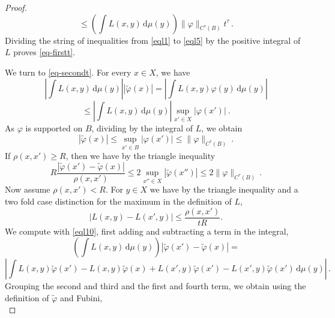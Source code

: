 \begin{proof}
    \begin{equation}\label{eql5}
         \le \left(\int L(x,y) \, \mathrm{d}\mu(y)\right)
         \|\varphi\|_{C^\tau(B)} t^{\tau} \, .
    \end{equation}
 Dividing the string of inequalities from \eqref{eql1} to
\eqref{eql5} by the positive integral of $L$ proves \eqref{eq-firstt}.


We turn to \eqref{eq-secondt}. For every $x\in X$, we have
\begin{equation}
    \left|\int L(x,y) \, \mathrm{d}\mu(y)\right||\tilde{\varphi}(x)|
    =\left|\int L(x,y) {\varphi}(y)\, \mathrm{d}\mu(y)\right|
\end{equation}
 \begin{equation}
    \le \left|\int L(x,y) \, \mathrm{d}\mu(y)\right| \sup_{x'\in X}
    |{\varphi}(x')|\ .
\end{equation}
As $\varphi$ is supported on $B$, dividing by the integral of $L$, we obtain
\begin{equation}\label{eql42}
 |\tilde{\varphi}(x)|\le \sup_{x'\in B}
    |{\varphi}(x')|\le \|\varphi\|_{C^\tau(B)}\ .
\end{equation}
If $\rho(x,x')\ge R$, then we have by the triangle inequality
  \begin{equation}\label{eql52}
 R\frac{|\tilde{\varphi}(x') - \tilde \varphi(x)|}{\rho(x,x')} \le
 2\sup_{x''\in X} |\tilde{\varphi}(x'')|\le 2\|\varphi\|_{C^\tau(B)}\, .
\end{equation}
Now assume $\rho(x,x')< R$. For $y\in X$ we have by the triangle inequality and a two fold case distinction
for the maximum in the definition of $L$,
\begin{equation}\label{eql10}
   |L(x,y) - L(x',y)| \le \frac{\rho(x,x')}{tR}.
\end{equation}
We compute with \eqref{eql10}, first adding and subtracting a term in the integral,
\begin{equation}
    \left(\int L(x,y) \, \mathrm{d}\mu(y)\right)
    |\tilde{\varphi}(x') - \tilde \varphi(x)|=
\end{equation}
\begin{equation}
    \left|\int L(x,y) \tilde{\varphi}(x')
    -L(x,y) \tilde{\varphi}(x)
    +L(x',y) \tilde{\varphi}(x')-
     L(x',y) \tilde{\varphi}(x')
    \, \mathrm{d}\mu(y)\right|\,.
\end{equation}
Grouping the second and third and the first and fourth term, we obtain using the definition of $\tilde \varphi$ and Fubini,
\begin{equation}\label{eql21}

\end{equation}
\end{proof}
